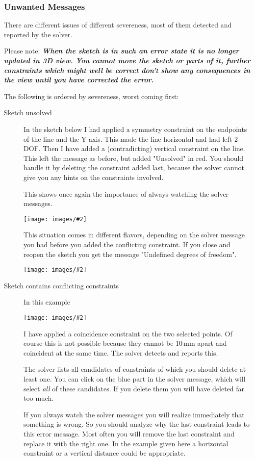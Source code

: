 \documentclass[12pt,titlepage]{article}
\newcommand{\icon}[1]{\raisebox{-1em}{\rule{0pt}{27pt}\texttt{[image: images/\#1]}}}
\newcommand{\img}[2]{\vspace{2ex}\noindent\texttt{[image: images/\#2]}}
\begin{document}
\subsubsection{Unwanted Messages} There are different issues of different severeness, most of them detected and reported by the solver.

Please note: {\bf\em When the sketch is in such an error state it is no longer updated in 3D view. You cannot move the sketch or parts of it, further constraints which might well be correct don't show any consequences in the view until you have corrected the error.}

The following is ordered by severeness, worst coming first: \begin{description} \item [Sketch unsolved] In the sketch below I had applied a symmetry constraint on the endpoints of the line and the Y-axis. This made the line horizontal and had left 2 DOF. Then I have added a (contradicting) vertical constraint on the line. This left the message as before, but added "Unsolved" in red. You should handle it by deleting the constraint added last, because the solver cannot give you any hints on the constraints involved.
	
	This shows once again the importance of always watching the solver messages.
	
	\img{}{ConstraintsSolverUnsolved}
	
	This situation comes in different flavors, depending on the solver message you had before you added the conflicting constraint. If you close and reopen the sketch you get the message "Undefined degrees of freedom".
	
	\img{}{ConstraintsSolverUndefined}
	
	\item [Sketch contains conflicting constraints] In this example
	
	\img{}{ConstraintsSolverConflicting}
	
	I have applied a coincidence constraint on the two selected points. Of course this is not possible because they cannot be 10\,mm apart and coincident at the same time. The solver detects and reports this.
	
	The solver lists all candidates of constraints of which you should delete at least one. You can click on the blue part in the solver message, which will select \emph{all} of these candidates. If you delete them you will have deleted far too much.
	
	If you always watch the solver messages you will realize immediately that something is wrong. So you should analyze why the last constraint leads to this error message. Most often you will remove the last constraint and replace it with the right one. In the example given here a horizontal constraint \icon{Constraint_Horizontal} or a vertical distance \icon{Constraint_VerticalDistance} could be appropriate.
	

\end{description}
\end{document}
